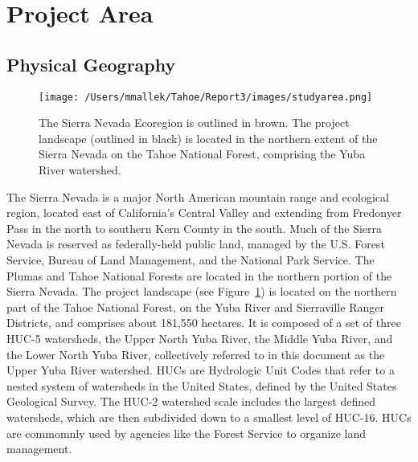 \section{Project Area}

\subsection{Physical Geography}

\begin{figure}[!htbp]
\texttt{[image: /Users/mmallek/Tahoe/Report3/images/studyarea.png]}
\caption{The Sierra Nevada Ecoregion is outlined in brown. The project landscape (outlined in black) is located in the northern extent of the Sierra Nevada on the Tahoe National Forest, comprising the Yuba River watershed.}
\label{projectarea}
\end{figure}

The Sierra Nevada is a major North American mountain range and ecological region, located east of California's Central Valley and extending from Fredonyer Pass in the north to southern Kern County in the south. Much of the Sierra Nevada is reserved as federally-held public land, managed by the U.S. Forest Service, Bureau of Land Management, and the National Park Service. The Plumas and Tahoe National Forests are located in the northern portion of the Sierra Nevada. The project landscape (see Figure~\ref{projectarea}) is located on the northern part of the Tahoe National Forest, on the Yuba River and Sierraville Ranger Districts, and comprises about 181,550 hectares. It is composed of a set of three HUC-5 watersheds, the Upper North Yuba River, the Middle Yuba River, and the Lower North Yuba River, collectively referred to in this document as the Upper Yuba River watershed. HUCs are Hydrologic Unit Codes that refer to a nested system of watersheds in the United States, defined by the United States Geological Survey. The HUC-2 watershed scale includes the largest defined watersheds, which are then subdivided down to a smallest level of HUC-16. HUCs are commomnly used by agencies like the Forest Service to organize land management.

